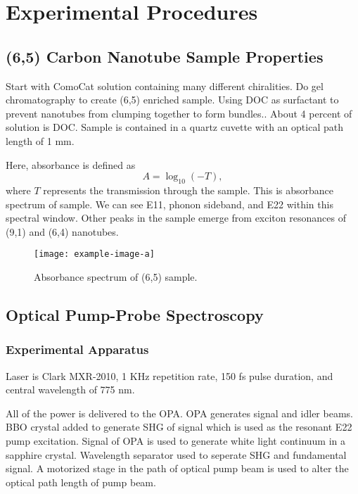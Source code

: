 \chapter{Experimental Procedures}

\section{(6,5) Carbon Nanotube Sample Properties}

Start with ComoCat solution containing many different chiralities. Do gel chromatography to create (6,5) enriched sample. Using DOC as surfactant to prevent nanotubes from clumping together to form bundles.. About 4 percent of solution is DOC. Sample is contained in a quartz cuvette with an optical path length of 1 mm.


Here, absorbance is defined as 
\begin{equation}
A = \log_{10}(-T),
\end{equation}
where $T$ represents the transmission through the sample. 
This is absorbance spectrum of sample. We can see E11, phonon sideband, and E22 within this spectral window. Other peaks in the sample emerge from exciton resonances of (9,1) and (6,4) nanotubes.

\begin{figure}[h]
	\centering
	\texttt{[image: example-image-a]}
	\caption{ Absorbance spectrum of (6,5) sample.}
	\label{fig:sample_absorbance}
\end{figure}

\section{Optical Pump-Probe Spectroscopy }

\subsection{Experimental Apparatus}
Laser is Clark MXR-2010, 1 KHz repetition rate, 150 fs pulse duration, and central wavelength of 775 nm.

All of the power is delivered to the OPA. OPA generates signal and idler beams. BBO crystal added to generate SHG of signal which is used as the resonant E22 pump excitation. Signal of OPA is used to generate white light continuum in a sapphire crystal. Wavelength separator used to seperate SHG and fundamental signal. A motorized stage in the path of optical pump beam is used to alter the optical path length of pump beam. 

